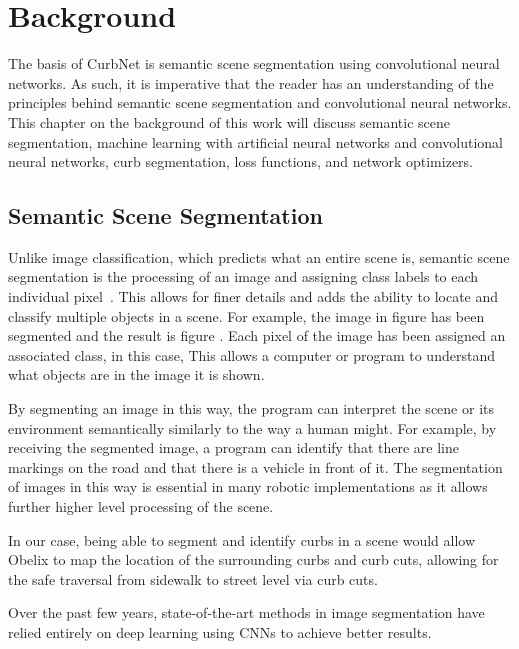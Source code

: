 \chapter{Background}\label{chap:background}
The basis of CurbNet is semantic scene segmentation using convolutional neural networks.
As such, it is imperative that the reader has an understanding of the principles behind semantic scene segmentation and convolutional neural networks.
This chapter on the background of this work will discuss semantic scene segmentation, machine learning with artificial neural networks and convolutional neural networks, curb segmentation, loss functions, and network optimizers.

\section{Semantic Scene Segmentation}\label{section:background-segmentation}
Unlike image classification, which predicts what an entire scene is, semantic scene segmentation is the processing of an image and assigning class labels to each individual pixel~\cite{segmentation-medium}.
This allows for finer details and adds the ability to locate and classify multiple objects in a scene.
For example, the image in figure  has been segmented and the result is figure .
Each pixel of the image has been assigned an associated class, in this case, 
This allows a computer or program to understand what objects are in the image it is shown.

By segmenting an image in this way, the program can interpret the scene or its environment semantically similarly to the way a human might.
For example, by receiving the segmented image, a program can identify that there are line markings on the road and that there is a vehicle in front of it.
The segmentation of images in this way is essential in many robotic implementations as it allows further higher level processing of the scene.

In our case, being able to segment and identify curbs in a scene would allow Obelix to map the location of the surrounding curbs and curb cuts, allowing for the safe traversal from sidewalk to street level via curb cuts.

Over the past few years, state-of-the-art methods in image segmentation have relied entirely on deep learning using CNNs to achieve better results.

